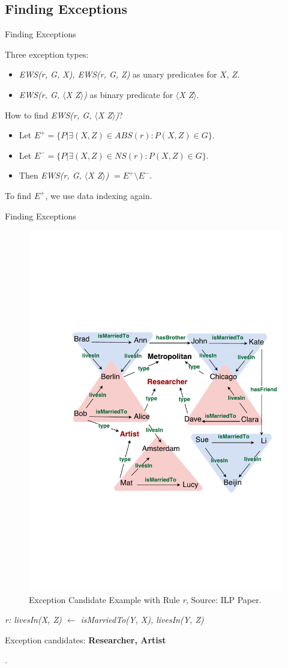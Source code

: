 \documentclass{beamer}
\begin{document}
\subsection{Finding Exceptions}

\begin{frame}{Finding Exceptions}

Three exception types:
\begin{itemize}
	\item \textit{EWS(r, G, X), EWS(r, G, Z)} as unary predicates for $X$, $Z$.
	\item {
		\textit{EWS(r, G, $\langle$X Z$\rangle$)} as binary predicate for \textit{$\langle$X Z$\rangle$}.
		\pause
	}
\end{itemize}

How to find \textit{EWS(r, G, $\langle$X Z$\rangle$)}?
\begin{itemize}
	\item Let $E^+ = \{P | \exists (X, Z) \in ABS(r): P(X, Z) \in G\}$.
	\item Let $E^- = \{P | \exists (X, Z) \in NS(r): P(X, Z) \in G\}$.
	\item Then \textit{EWS(r, G, $\langle$X Z$\rangle$)} $= E^+ \setminus E^-$.
\end{itemize}

To find $E^+$, we use data indexing again.

\end{frame}

\begin{frame}{Finding Exceptions}

\begin{figure}[h]
	\centering
	\includegraphics[page=1,width=.5\textwidth]{example.pdf}
	\caption{Exception Candidate Example with Rule \textit{r}, Source: ILP Paper.}
\end{figure}

\centerline{\textit{r: livesIn(X, Z) $\leftarrow$ isMarriedTo(Y, X), livesIn(Y, Z)}}
\centerline{Exception candidates: \textbf{Researcher, Artist}}.

\end{frame}
\end{document}

